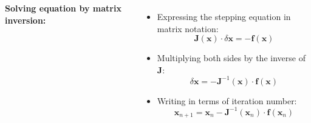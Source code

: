 \begin{frame}[fragile]
\begin{columns}
    \textbf{Solving equation by matrix inversion:}
    \begin{itemize}
      \item Expressing the stepping equation in matrix notation:
      \[
        \mathbf{J}(\mathbf{x})\cdot\delta\mathbf{x} = -\mathbf{f}(\mathbf{x})  
      \]
      \item Multiplying both sides by the inverse of $\mathbf{J}$:
      \[
        \delta\mathbf{x} = -\mathbf{J}^{-1}(\mathbf{x})\cdot\mathbf{f}(\mathbf{x})  
      \]
      \item Writing in terms of iteration number:
      \[
        \boxed{\mathbf{x}_{n+1} = \mathbf{x}_n-\mathbf{J}^{-1}(\mathbf{x}_n)\cdot\mathbf{f}(\mathbf{x}_n)}
      \]
    \end{itemize}
    \end{columns}
\end{frame}


